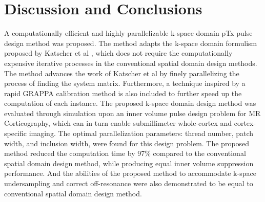 \section*{Discussion and Conclusions}

A computationally efficient and highly parallelizable k-space domain pTx pulse design method was proposed.
The method adapts the k-space domain formulism proposed by Katscher et al \cite{katscher2003transmit}, which does not require the computationally expensive iterative processes in the conventional spatial domain design methods. The method advances the work of Katscher et al \cite{katscher2003transmit} by finely parallelizing the process of finding the system matrix. Furthermore, a technique inspired by a rapid GRAPPA calibration method \cite{luo2019grappa} is also included to further speed up the computation of each instance. The proposed k-space domain design method was evaluated through simulation upon an inner volume pulse design problem for MR Corticography, which can in turn enable submillimeter whole-cortex and cortex-specific imaging. The optimal parallelization parameters: thread number, patch width, and inclusion width, were found for this design problem. The proposed method reduced the computation time by 97\% compared to the conventional spatial domain design method, while producing equal inner volume suppression performance. And the abilities of the proposed method to accommodate k-space undersampling and correct off-resonance were also demonstrated to be equal to conventional spatial domain design method.